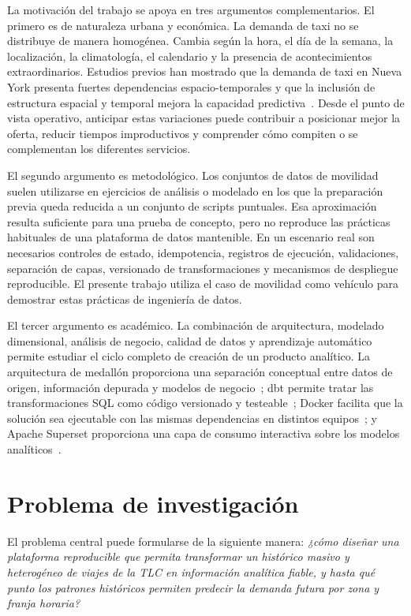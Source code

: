 La motivación del trabajo se apoya en tres argumentos complementarios. El primero es de naturaleza urbana y económica. La demanda de taxi no se distribuye de manera homogénea. Cambia según la hora, el día de la semana, la localización, la climatología, el calendario y la presencia de acontecimientos extraordinarios. Estudios previos han mostrado que la demanda de taxi en Nueva York presenta fuertes dependencias espacio-temporales y que la inclusión de estructura espacial y temporal mejora la capacidad predictiva~\cite{safikhani2020,faghih2019,toman2020}. Desde el punto de vista operativo, anticipar estas variaciones puede contribuir a posicionar mejor la oferta, reducir tiempos improductivos y comprender cómo compiten o se complementan los diferentes servicios.

El segundo argumento es metodológico. Los conjuntos de datos de movilidad suelen utilizarse en ejercicios de análisis o modelado en los que la preparación previa queda reducida a un conjunto de scripts puntuales. Esa aproximación resulta suficiente para una prueba de concepto, pero no reproduce las prácticas habituales de una plataforma de datos mantenible. En un escenario real son necesarios controles de estado, idempotencia, registros de ejecución, validaciones, separación de capas, versionado de transformaciones y mecanismos de despliegue reproducible. El presente trabajo utiliza el caso de movilidad como vehículo para demostrar estas prácticas de ingeniería de datos.

El tercer argumento es académico. La combinación de arquitectura, modelado dimensional, análisis de negocio, calidad de datos y aprendizaje automático permite estudiar el ciclo completo de creación de un producto analítico. La arquitectura de medallón proporciona una separación conceptual entre datos de origen, información depurada y modelos de negocio~\cite{databricks_medallion}; dbt permite tratar las transformaciones SQL como código versionado y testeable~\cite{dbt_docs}; Docker facilita que la solución sea ejecutable con las mismas dependencias en distintos equipos~\cite{docker_compose}; y Apache Superset proporciona una capa de consumo interactiva sobre los modelos analíticos~\cite{superset_docs}.

\section{Problema de investigación}

El problema central puede formularse de la siguiente manera: \textit{¿cómo diseñar una plataforma reproducible que permita transformar un histórico masivo y heterogéneo de viajes de la TLC en información analítica fiable, y hasta qué punto los patrones históricos permiten predecir la demanda futura por zona y franja horaria?}


